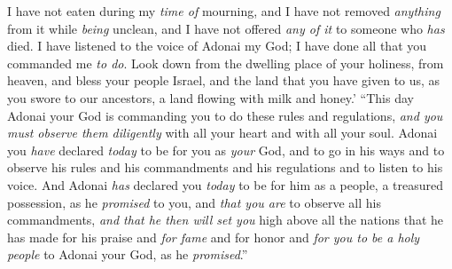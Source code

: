 \begin{biblechapter}
\verse I have not eaten during my \textit{time of} mourning, and I have not removed \textit{anything} from it while \textit{being} unclean, and I have not offered \textit{any of it} to someone who \textit{has} died. I have listened to the voice of Adonai my God; I have done all that you commanded me \textit{to do}.
\verse Look down from the dwelling place of your holiness, from heaven, and bless your people Israel, and the land that you have given to us, as you swore to our ancestors, a land flowing with milk and honey.’
\verse “This day Adonai your God is commanding you to do these rules and regulations, \textit{and you must observe them diligently} with all your heart and with all your soul.
\verse Adonai you \textit{have} declared \textit{today} to be for you as \textit{your} God, and to go in his ways and to observe his rules and his commandments and his regulations and to listen to his voice.
\verse And Adonai \textit{has} declared you \textit{today} to be for him as a people, a treasured possession, as he \textit{promised} to you, and \textit{that you are} to observe all his commandments,
\verse \textit{and that he then will set you} high above all the nations that he has made for his praise and \textit{for fame} and for honor and \textit{for you to be a holy people} to Adonai your God, as he \textit{promised}.”
\end{biblechapter}

